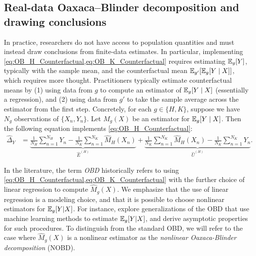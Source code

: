 \subsection{Real-data Oaxaca--Blinder decomposition and drawing conclusions} 
\label{sec:ob_real}
In practice, researchers do not have access to population quantities and must instead draw conclusions from finite-data estimates.
In particular, implementing \cref{eq:OB_H_Counterfactual,eq:OB_K_Counterfactual} requires estimating $\mathbb{E}_g[Y]$, typically with the sample mean, and the counterfactual mean $\mathbb{E}_{g'}[\mathbb{E}_g[Y \mid X]]$, which requires more thought. 
Practitioners typically estimate counterfactual means by (1) using data from $g$ to compute an estimator of $\mathbb{E}_g[Y \mid X]$ (essentially a regression), and (2) using data from $g'$ to take the sample average across the estimator from the first step.
Concretely, for each $g \in {\{H, K\}}$, suppose we have $N_g$ observations of $\{X_n, Y_n\}$. Let $\hat{M}_g(X)$ be an estimator for $\mathbb{E}_g[Y \mid X]$.
Then the following equation implements \cref{eq:OB_H_Counterfactual}:
\begin{align}	
    \hat{\Delta}_Y
    \label{eq:NOBD_H_estimated}
    &=\underbrace{ \frac{1}{N_H} \sum_{n=1}^{N_H} Y_n - \frac{1}{N_K} \sum_{n=1}^{N_K} \hat{M}_H(X_n)}_{\hat{E}^{(H)}} 
     + \underbrace{\frac{1}{N_K} \sum_{n=1}^{N_K} \hat{M}_H(X_n) - \frac{1}{N_K} \sum_{n=1}^{N_K} Y_n}_{\hat{U}^{(H)} }.
\end{align}

In the literature, the term \emph{OBD} historically refers to using \cref{eq:OB_H_Counterfactual,eq:OB_K_Counterfactual} with the further choice of linear regression to compute $\hat{M}_g(X)$.
We emphasize that the use of linear regression is a modeling choice, and that it is possible to choose nonlinear estimators for $\mathbb{E}_g  [ Y | X ]$.
For instance, \citet{quintas2024multiply,flachaire2025decomposing,mao2025double} explore generalizations of the OBD that use machine learning methods to estimate $\mathbb{E}_g  [ Y | X ]$, and derive asymptotic properties for such procedures.
To distinguish from the standard OBD, we will refer to the case where $\hat{M}_g(X)$ is a nonlinear estimator as the \emph{nonlinear Oaxaca-Blinder decomposition} (NOBD).

